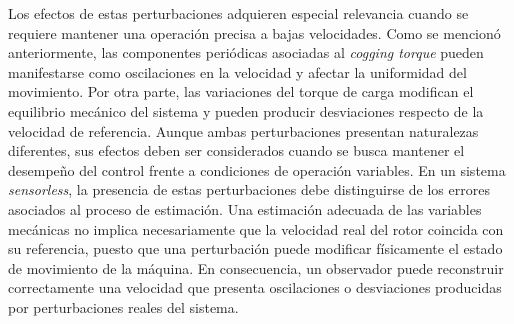 Los efectos de estas perturbaciones adquieren especial relevancia cuando se
requiere mantener una operación precisa a bajas velocidades. Como se mencionó
anteriormente, las componentes periódicas asociadas al \textit{cogging torque}
pueden manifestarse como oscilaciones en la velocidad y afectar la uniformidad
del movimiento. Por otra parte, las variaciones del torque de carga modifican
el equilibrio mecánico del sistema y pueden producir desviaciones respecto de
la velocidad de referencia. Aunque ambas perturbaciones presentan naturalezas
diferentes, sus efectos deben ser considerados cuando se busca mantener el
desempeño del control frente a condiciones de operación variables.
%
%
%
%
%
%
%
%
%
%
%
%
%
%
%
%
%
%
%
%
%
%
%
%
%
%
%
%
%
%
En un sistema \textit{sensorless}, la presencia de estas perturbaciones debe
distinguirse de los errores asociados al proceso de estimación. Una estimación
adecuada de las variables mecánicas no implica necesariamente que la velocidad
real del rotor coincida con su referencia, puesto que una perturbación puede
modificar físicamente el estado de movimiento de la máquina. En consecuencia,
un observador puede reconstruir correctamente una velocidad que presenta
oscilaciones o desviaciones producidas por perturbaciones reales del sistema.

